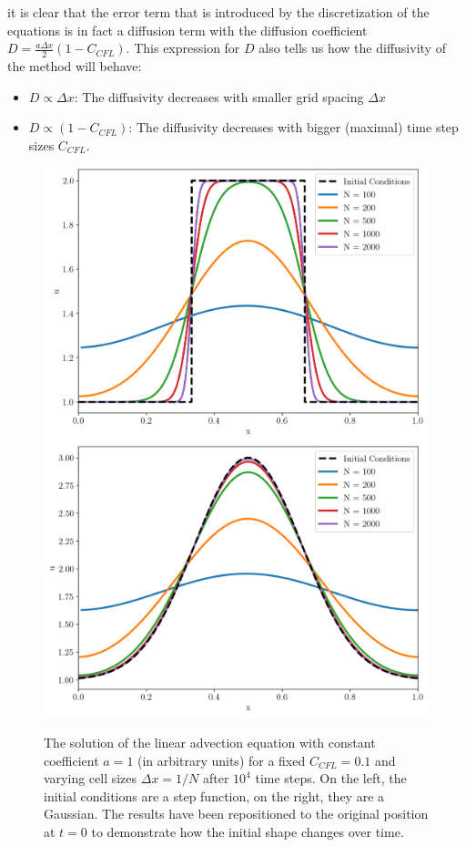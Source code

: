 it is clear that the error term that is introduced by the discretization of the equations is in
fact a diffusion term with the diffusion coefficient $D = \frac{a \Delta x}{2} \left( 1 - C_{CFL}
\right)$. This expression for $D$ also tells us how the diffusivity of the method will behave:

\begin{itemize}
 \item $D \propto \Delta x$: The diffusivity decreases with smaller grid spacing $\Delta x$
 \item $D \propto (1 - C_{CFL})$: The diffusivity decreases with bigger (maximal) time step sizes
    $C_{CFL}$.
\end{itemize}


\begin{figure}
    \centering
    \includegraphics[width=.5\textwidth]{
    ./figures/FV/advection_pwconst/advection-1D-diffusivity-dx-step.png}%
    \includegraphics[width=.5\textwidth]{
    ./figures/FV/advection_pwconst/advection-1D-diffusivity-dx-gaussian.png}%
    \caption[Dependence of the numerical diffusion on $\Delta x$.]{
The solution of the linear advection equation with constant coefficient $a = 1$ (in arbitrary
units) for a fixed $C_{CFL} = 0.1$ and varying cell sizes $\Delta x = 1/N$ after $10^4$ time
steps. On the left, the initial conditions are a step function, on the right, they are a
Gaussian. The results have been repositioned to the original position at $t=0$ to demonstrate
how the initial shape changes over time.
}%
    \label{fig:linear-advection-diffusivity-dx}
\end{figure}


